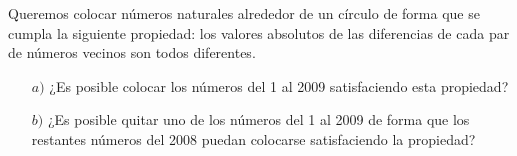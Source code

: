 Queremos colocar números naturales alrededor de un círculo de forma que se cumpla la siguiente propiedad: los valores absolutos de las diferencias de cada par de números vecinos son todos diferentes. 
\begin{enumerate}
    \item[$a)$] ¿Es posible colocar los números del 1 al 2009 satisfaciendo esta propiedad? 
    \item[$b)$] ¿Es posible quitar uno de los números del 1 al 2009 de forma que los restantes números del 2008 puedan colocarse satisfaciendo la propiedad?
\end{enumerate}
